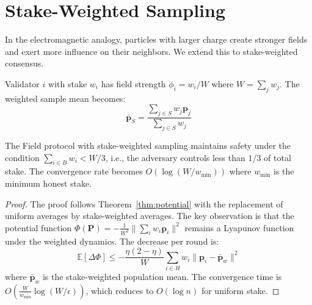 \section{Stake-Weighted Sampling}

\label{sec:stake}

In the electromagnetic analogy, particles with larger charge create stronger fields
and exert more influence on their neighbors. We extend this to stake-weighted consensus.

\begin{definition}
Validator $i$ with stake $w_i$ has field strength $\phi_i = w_i / W$ where $W = \sum_j w_j$.
The weighted sample mean becomes:
\[
\bar{\mathbf{p}}_S = \frac{\sum_{j \in S} w_j \mathbf{p}_j}{\sum_{j \in S} w_j}
\]
\end{definition}

\begin{theorem}
\label{thm:stake}
The Field protocol with stake-weighted sampling maintains safety under the condition
$\sum_{i \in B} w_i < W/3$, i.e., the adversary controls less than $1/3$ of total stake.
The convergence rate becomes $O(\log(W/w_{\min}))$ where $w_{\min}$ is the minimum
honest stake.
\end{theorem}

\begin{proof}
The proof follows Theorem~\ref{thm:potential} with the replacement of uniform averages
by stake-weighted averages. The key observation is that the potential function
$\Phi(\mathbf{P}) = -\frac{1}{W^2}\|\sum_i w_i \mathbf{p}_i\|^2$ remains a Lyapunov
function under the weighted dynamics. The decrease per round is:
\[
\mathbb{E}[\Delta \Phi] \leq -\frac{\eta(2-\eta)}{W} \sum_{i \in H} w_i \|\mathbf{p}_i - \bar{\mathbf{p}}_w\|^2
\]
where $\bar{\mathbf{p}}_w$ is the stake-weighted population mean. The convergence time
is $O(\frac{W}{w_{\min}} \log(W/\epsilon))$, which reduces to $O(\log n)$ for uniform stake.
\end{proof}

